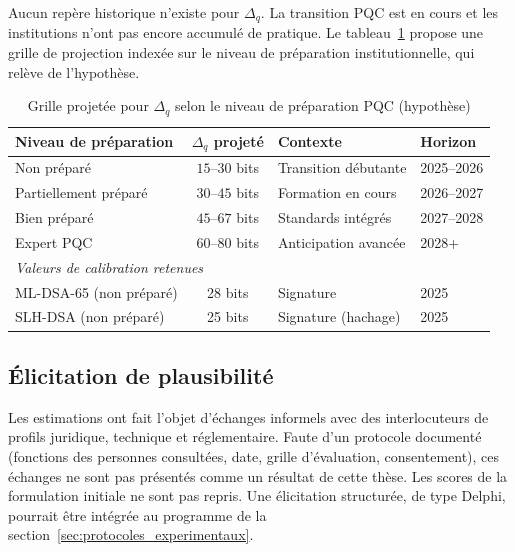 \begin{sloppypar}
Aucun rep\`ere historique n'existe pour $\Delta_q$. La transition PQC est en
cours et les institutions n'ont pas encore accumul\'e de pratique. Le
tableau~\ref{tab:benchmarks_quantiques} propose une grille de projection
index\'ee sur le niveau de pr\'eparation institutionnelle, qui rel\`eve de
l'hypoth\`ese.

\begin{table}[htbp]
\centering
\caption{Grille projet\'ee pour $\Delta_q$ selon le niveau de pr\'eparation PQC (hypoth\`ese)}
\label{tab:benchmarks_quantiques}
\begin{tabular}{@{}lcll@{}}
\toprule
\textbf{Niveau de pr\'eparation} & $\Delta_q$ \textbf{projet\'e} &
\textbf{Contexte} & \textbf{Horizon} \\
\midrule
Non pr\'epar\'e & $15$--$30$ bits & Transition d\'ebutante & 2025--2026 \\
Partiellement pr\'epar\'e & $30$--$45$ bits & Formation en cours & 2026--2027 \\
Bien pr\'epar\'e & $45$--$67$ bits & Standards int\'egr\'es & 2027--2028 \\
Expert PQC & $60$--$80$ bits & Anticipation avanc\'ee & 2028+ \\
\midrule
\multicolumn{4}{l}{\textit{Valeurs de calibration retenues}} \\
\midrule
ML-DSA-65 (non pr\'epar\'e) & 28 bits & Signature & 2025 \\
SLH-DSA (non pr\'epar\'e) & 25 bits & Signature (hachage) & 2025 \\
\bottomrule
\end{tabular}
\end{table}
\end{sloppypar}

\subsection{\'Elicitation de plausibilit\'e}
\label{sec:evaluation_experts}
\begin{sloppypar}

Les estimations ont fait l'objet d'\'echanges informels avec des interlocuteurs
de profils juridique, technique et r\'eglementaire. Faute d'un protocole
document\'e (fonctions des personnes consult\'ees, date, grille d'\'evaluation,
consentement), ces \'echanges ne sont pas pr\'esent\'es comme un r\'esultat de
cette th\`ese. Les scores de la formulation initiale ne sont pas repris. Une
\'elicitation structur\'ee, de type Delphi, pourrait \^etre int\'egr\'ee au
programme de la section~\ref{sec:protocoles_experimentaux}.
\end{sloppypar}

